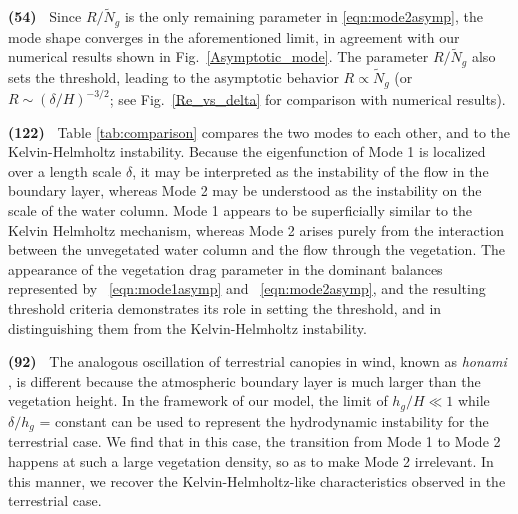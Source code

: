 \documentclass[aps,prl,reprint,twocolumn,superscriptaddress,sort&compress,10pt]{revtex4-1}  %
\newcommand{\hg}{h_g}
\newcommand{\Rey}{{R}}
\newcommand{\Ndg}{\tilde{N}_g}
\newcommand{\words}[1]{\textbf{(#1)~}}
\begin{document}
\words{54} Since $\Rey/\Ndg$ is the only remaining parameter in \eqref{eqn:mode2asymp}, the mode shape converges in the aforementioned limit, in agreement with our numerical results shown in Fig.~\ref{Asymptotic_mode}. 
The parameter $\Rey/\Ndg$ also sets the threshold, leading to the asymptotic behavior $\Rey \propto \Ndg$ (or $\Rey \sim ({\delta}/{H})^{-3/2}$; see Fig.~\ref{Re_vs_delta} for comparison with numerical results).

\words{122} Table \ref{tab:comparison} compares the two modes to each other, and to the Kelvin-Helmholtz instability. 
Because the eigenfunction of Mode 1 is localized over a length scale $\delta$, it may be interpreted as the instability of the flow in the boundary layer, whereas Mode 2 may be understood as the instability on the scale of the water column. 
Mode 1 appears to be superficially similar to the Kelvin Helmholtz mechanism, whereas Mode 2 arises purely from the interaction between the unvegetated water column and the flow through the vegetation. 
The appearance of the vegetation drag parameter in the dominant balances represented by ~\eqref{eqn:mode1asymp} and ~\eqref{eqn:mode2asymp}, and the resulting threshold criteria demonstrates its role in setting the threshold, and in distinguishing them from the Kelvin-Helmholtz instability.

\words{92} The analogous oscillation of terrestrial canopies in wind, known as \textit{honami} \cite{Inoue56,Raupach96}, is different because the atmospheric boundary layer is much larger than the vegetation height.
In the framework of our model, the limit of $\hg/H \ll 1$ while $\delta/\hg$ = constant can be used to represent the hydrodynamic instability for the terrestrial case.
We find that in this case, the transition from Mode 1 to Mode 2 happens at such a large vegetation density, so as to make Mode 2 irrelevant. 
In this manner, we recover the Kelvin-Helmholtz-like characteristics observed in the terrestrial case. 
\end{document}

